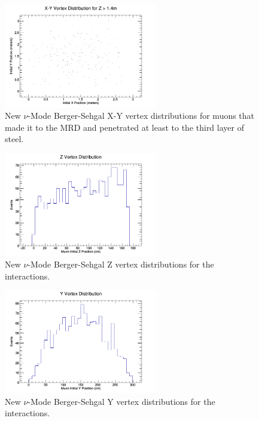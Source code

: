 \documentclass[11pt]{article}
\begin{document}
\begin{figure}[H]
\centering
\includegraphics[width=0.6\textwidth]{NewNMBergerSehgalImages/1-X-YVertexDistributionNMBS.png}
\caption{New $\nu$-Mode Berger-Sehgal X-Y vertex distributions for muons that made it to the MRD and penetrated at least to the third layer of steel.}
\end{figure}

\begin{figure}[H]
\centering
\includegraphics[width=0.6\textwidth]{NewNMBergerSehgalImages/2-ZVertexDistributionNMBS.png}
\caption{New $\nu$-Mode Berger-Sehgal Z vertex distributions for the interactions.}
\end{figure}

\begin{figure}[H]
\centering
\includegraphics[width=0.6\textwidth]{NewNMBergerSehgalImages/3-YVertexDistributionNMBS.png}
\caption{New $\nu$-Mode Berger-Sehgal Y vertex distributions for the interactions.}
\end{figure}
\end{document}
